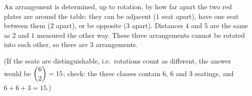 An arrangement is determined, up to rotation, by how far apart the two red plates are around the table: they can be adjacent ($1$ seat apart), have one seat between them ($2$ apart), or be opposite ($3$ apart). Distances $4$ and $5$ are the same as $2$ and $1$ measured the other way. These three arrangements cannot be rotated into each other, so there are $\boxed{3}$ arrangements.

(If the seats are distinguishable, i.e.\ rotations count as different, the answer would be $\dbinom62=15$; check: the three classes contain $6$, $6$ and $3$ seatings, and $6+6+3=15$.)
